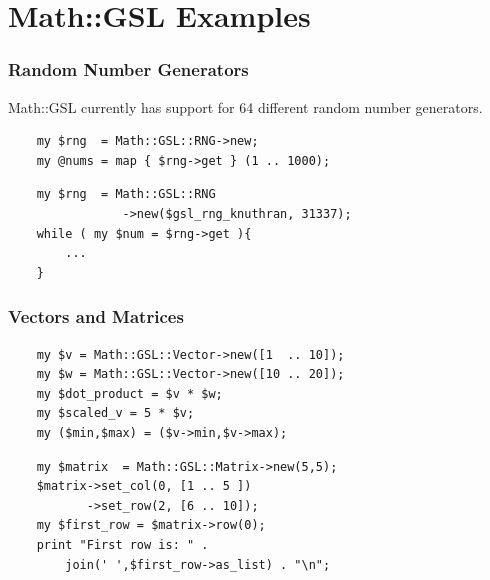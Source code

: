 \documentclass[12pt]{beamer}
\begin{document}
\section{Math::GSL Examples}
\begin{frame}[fragile]
    \frametitle{Random Number Generators}
    Math::GSL currently has support for 64 different random number generators.
    \begin{center}
    \begin{small}
    \begin{verbatim}
    my $rng  = Math::GSL::RNG->new;
    my @nums = map { $rng->get } (1 .. 1000);
    \end{verbatim}

    \begin{verbatim}
    my $rng  = Math::GSL::RNG
                ->new($gsl_rng_knuthran, 31337);
    while ( my $num = $rng->get ){
        ...
    }
    \end{verbatim}
    \end{small}
    \end{center}
\end{frame}

\begin{frame}[fragile]
    \frametitle{Vectors and Matrices}
    \begin{center}
    \begin{small}
    \begin{verbatim}
    my $v = Math::GSL::Vector->new([1  .. 10]);
    my $w = Math::GSL::Vector->new([10 .. 20]);
    my $dot_product = $v * $w;
    my $scaled_v = 5 * $v;
    my ($min,$max) = ($v->min,$v->max);

    \end{verbatim}

    \begin{verbatim}
    my $matrix  = Math::GSL::Matrix->new(5,5);
    $matrix->set_col(0, [1 .. 5 ])
           ->set_row(2, [6 .. 10]);
    my $first_row = $matrix->row(0);
    print "First row is: " . 
        join(' ',$first_row->as_list) . "\n";

    \end{verbatim}
    \end{small}
    \end{center}
\end{frame}
\end{document}
